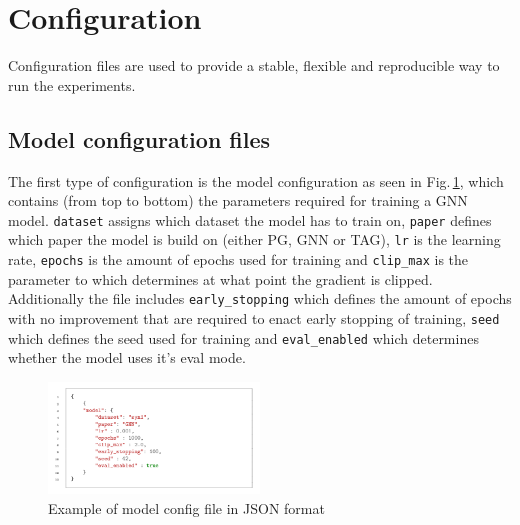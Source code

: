 \section{Configuration}
Configuration files are used to provide a stable, flexible and reproducible way to run the experiments.
\subsection{Model configuration files}
The first type of configuration is the model configuration as seen in Fig.\,\ref{fig:model-config-example}, which contains (from top to bottom) the parameters required for training a GNN model. \texttt{dataset} assigns which dataset the model has to train on, \texttt{paper} defines which paper the model is build on (either PG, GNN or TAG), \texttt{lr} is the learning rate, \texttt{epochs} is the amount of epochs used for training and \texttt{clip\_max} is the parameter to which determines at what point the gradient is clipped. Additionally the file includes \texttt{early\_stopping} which defines the amount of epochs with no improvement that are required to enact early stopping of training, \texttt{seed} which defines the seed used for training and \texttt{eval\_enabled} which determines whether the model uses it's eval mode.
\begin{figure}[h!]
    \centering
    \includegraphics[width=0.5\textwidth]{imgs/config-examples/model-config-example.png}
    \caption{Example of model config file in JSON format} 
\label{fig:model-config-example}
\end{figure}



